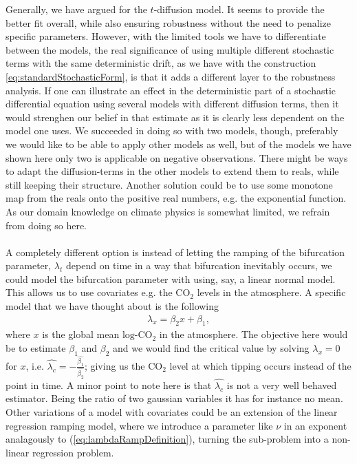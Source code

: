 Generally, we have argued for the $t$-diffusion model. It seems to provide the better fit overall, while also ensuring robustness without the need to penalize specific parameters. However, with the limited tools we have to differentiate between the models, the real significance of using multiple different stochastic terms with the same deterministic drift, as we have with the construction \ref{eq:standardStochasticForm}, is that it adds a different layer to the robustness analysis. If one can illustrate an effect in the deterministic part of a stochastic differential equation using several models with different diffusion terms, then it would strenghen our belief in that estimate as it is clearly less dependent on the model one uses. We succeeded in doing so with two models, though, preferably we would like to be able to apply other models as well, but of the models we have shown here only two is applicable on negative observations. There might be ways to adapt the diffusion-terms in the other models to extend them to reals, while still keeping their structure. Another solution could be to use some monotone map from the reals onto the positive real numbers, e.g. the exponential function. As our domain knowledge on climate physics is somewhat limited, we refrain from doing so here.\\\\
A completely different option is instead of letting the ramping of the bifurcation parameter, $\lambda_t$ depend on time in a way that bifurcation inevitably occurs, we could model the bifurcation parameter with using, say, a linear normal model. This allows us to use covariates e.g. the $\mathrm{CO}_2$ levels in the atmosphere. A specific model that we have thought about is the following
\begin{align}
    \lambda_x= \beta_2 x + \beta_1, \label{eq:alternativeLambda}
\end{align}
where $x$ is the global mean $\mathrm{log}$-$\mathrm{CO}_2$ in the atmosphere. The objective here would be to estimate $\beta_1$ and $\beta_2$ and we would find the critical value by solving $\lambda_x = 0$ for $x$, i.e. $\hat{\lambda_c} = -\frac{\hat{\beta_1}}{\hat{\beta_2}}$; giving us the $\mathrm{CO}_2$ level at which tipping occurs instead of the point in time. A minor point to note here is that $\hat{\lambda_c}$ is not a very well behaved estimator. Being the ratio of two gaussian variables it has for instance no mean. Other variations of a model with covariates could be an extension of the linear regression ramping model, where we introduce a parameter like $\nu$ in an exponent analagously to (\ref{eq:lambdaRampDefinition}), turning the sub-problem into a non-linear regression problem. \\\\
